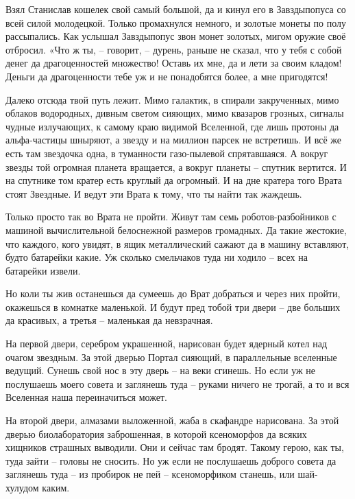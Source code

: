 \documentclass[ebook,oneside,final,openright]{memoir}
\begin{document}
Взял Станислав кошелек свой самый большой, да и кинул его в Завздыпопуса со всей силой молодецкой. Только промахнулся немного, и золотые монеты по полу рассыпались. Как услышал Завздыпопус звон монет золотых, мигом оружие своё отбросил. «Что ж ты, – говорит, – дурень, раньше не сказал, что у тебя с собой денег да драгоценностей множество! Оставь их мне, да и лети за своим кладом! Деньги да драгоценности тебе уж и не понадобятся более, а мне пригодятся!\par
\par
Далеко отсюда твой путь лежит. Мимо галактик, в спирали закрученных, мимо облаков водородных, дивным светом сияющих, мимо квазаров грозных, сигналы чудные излучающих, к самому краю видимой Вселенной, где лишь протоны да альфа-частицы шныряют, а звезду и на миллион парсек не встретишь. И всё же есть там звездочка одна, в туманности газо-пылевой спрятавшаяся. А вокруг звезды той огромная планета вращается, а вокруг планеты – спутник вертится. И на спутнике том кратер есть круглый да огромный. И на дне кратера того Врата стоят Звездные. И ведут эти Врата к тому, что ты найти так жаждешь.\par
\par
Только просто так во Врата не пройти. Живут там семь роботов-разбойников с машиной вычислительной белоснежной размеров громадных. Да такие жестокие, что каждого, кого увидят, в ящик металлический сажают да в машину вставляют, будто батарейки какие. Уж сколько смельчаков туда ни ходило – всех на батарейки извели.\par
\par
Но коли ты жив останешься да сумеешь до Врат добраться и через них пройти, окажешься в комнатке маленькой. И будут пред тобой три двери – две больших да красивых, а третья – маленькая да невзрачная.\par
\par
На первой двери, серебром украшенной, нарисован будет ядерный котел над очагом звездным. За этой дверью Портал сияющий, в параллельные вселенные ведущий. Сунешь свой нос в эту дверь – на веки сгинешь. Но если уж не послушаешь моего совета и заглянешь туда – руками ничего не трогай, а то и вся Вселенная наша переиначиться может.\par
\par
На второй двери, алмазами выложенной, жаба в скафандре нарисована. За этой дверью биолаборатория заброшенная, в которой ксеноморфов да всяких хищников страшных выводили. Они и сейчас там бродят. Такому герою, как ты, туда зайти – головы не сносить. Но уж если не послушаешь доброго совета да заглянешь туда – из пробирок не пей – ксеноморфиком станешь, или шай-хулудом каким.\par
\end{document}
